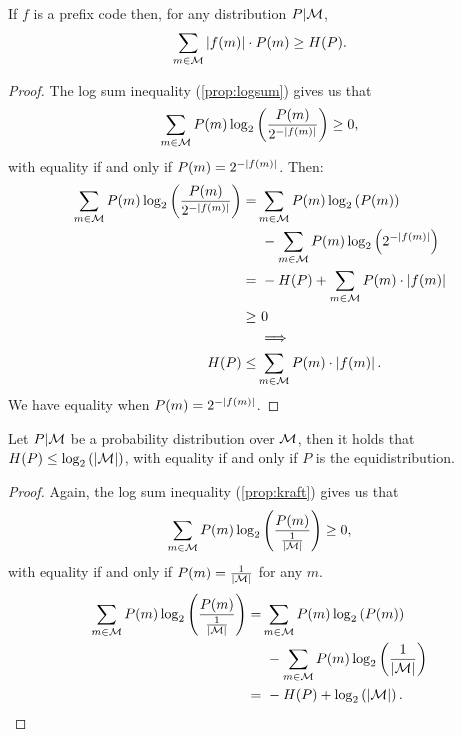 \begin{prop}
	If $f$ is a prefix code then, for any distribution $P|\mathcal{M}$,
	\begin{equation*}
		\sum_{m \in \mathcal{M}} \left|{f(m)}\right| \cdot P(m) \ge H(P).
	\end{equation*}
\end{prop}

\begin{proof}
The log sum inequality (\cref{prop:logsum}) gives us that
\begin{equation*}
	\sum_{m \in \mathcal{M}} P(m) \log_2 \left( \frac{P(m)}{2^{-\left|{f(m)}\right|}} \right) \ge 0,
\end{equation*}
with equality if and only if $P(m) = 2^{-\left|{f(m)}\right|}$.
Then:
\begin{align*}
	\sum_{m \in \mathcal{M}} P(m) \log_2 \left( \frac{P(m)}{2^{-\left|{f(m)}\right|}} \right)
	= &
	\sum_{m \in \mathcal{M}} P(m) \log_2 \left( P(m) \right)
	\\
	&~-
	\sum_{m \in \mathcal{M}} P(m) \log_2 \left( 2^{-\left|{f(m)}\right|} \right)
	\\
	=
	&~-
	H(P) + \sum_{m \in \mathcal{M}} P(m) \cdot \left|{f(m)}\right|
	\\
	\ge &~0
	\\
	&
	\implies
	\\
	H(P)
	\le &
	\sum_{m \in \mathcal{M}} P(m) \cdot \left|{f(m)}\right|.
\end{align*}
We have equality when $P(m) = 2^{-\left|{f(m)}\right|}$.
\end{proof}

\begin{obs}
	Let $P|\mathcal{M}$ be a probability distribution over $\mathcal{M}$, then it holds that $H(P) \le \log_2 \left(\left|{\mathcal{M}}\right|\right)$, with equality if and only if $P$ is the equidistribution.
\end{obs}

\begin{proof}
	Again, the log sum inequality (\cref{prop:kraft}) gives us that
	\begin{equation*}
		\sum_{m \in \mathcal{M}} P(m) \log_2 \left( \frac{P(m)}{\frac{1}{\left|{\mathcal{M}}\right|}} \right) \ge 0,
	\end{equation*}
	with equality if and only if $P(m) = \frac{1}{\left|{\mathcal{M}}\right|}$ for any $m$.
	\begin{align*}
		\sum_{m \in \mathcal{M}} P(m) \log_2 \left( \frac{P(m)}{\frac{1}{\left|{\mathcal{M}}\right|}} \right)
		= &
		\sum_{m \in \mathcal{M}} P(m) \log_2 \left( P(m) \right)
		\\
		&~-
		\sum_{m \in \mathcal{M}} P(m) \log_2 \left( \frac{1}{\left|{\mathcal{M}}\right|} \right)
		\\
		=
		&~- H(P) + \log_2 \left( \left|{\mathcal{M}}\right| \right).
	\end{align*}
\end{proof}

